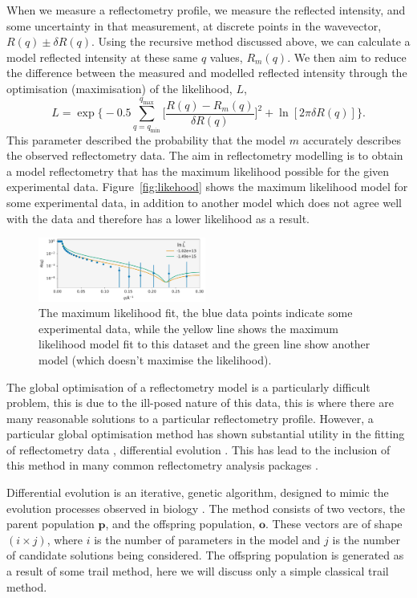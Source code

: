 \documentclass[
 reprint,
 superscriptaddress,
 amsmath,amssymb,
 aps,
]{revtex4-1}
\begin{document}
When we measure a reflectometry profile, we measure the reflected intensity, and some uncertainty in that measurement, at discrete points in the wavevector, $R(q) \pm \delta R(q)$. 
Using the recursive method discussed above, we can calculate a model reflected intensity at these same $q$ values, $R_m(q)$. 
We then aim to reduce the difference between the measured and modelled reflected intensity through the optimisation (maximisation) of the likelihood, $L$, 
%
\begin{equation}
    L = \exp{\bigg\{-0.5 \sum_{q=q_{\text{min}}}^{q_{\text{max}}} \bigg[\frac{R(q) - R_m(q)}{\delta R(q)}\bigg]^2 + \ln[2\pi \delta R(q)]\bigg\}}.
\end{equation}
%
This parameter described the probability that the model $m$ accurately describes the observed reflectometry data. 
The aim in reflectometry modelling is to obtain a model reflectometry that has the maximum likelihood possible for the given experimental data. 
Figure~\ref{fig:likehood} shows the maximum likelihood model for some experimental data, in addition to another model which does not agree well with the data and therefore has a lower likelihood as a result. 
%
\begin{figure}[t]
    \includegraphics[width=0.49\textwidth]{likelihood}
    \caption{The maximum likelihood fit, the blue data points indicate some experimental data, while the yellow line shows the maximum likelihood model fit to this dataset and the green line show another model (which doesn't maximise the likelihood).}
    \label{fig:likelihood}
\end{figure}
%

The global optimisation of a reflectometry model is a particularly difficult problem, this is due to the ill-posed nature of this data, this is where there are many reasonable solutions to a particular reflectometry profile.
However, a particular global optimisation method has shown substantial utility in the fitting of reflectometry data \cite{varderlee_comparison_2007}, differential evolution \cite{wormington_characterization_1999}.
This has lead to the inclusion of this method in many common reflectometry analysis packages \cite{bjorck_fitting_2011}.

Differential evolution is an iterative, genetic algorithm, designed to mimic the evolution processes observed in biology \cite{holland_adaptation_1992}.
The method consists of two vectors, the parent population $\mathbf{p}$, and the offspring population, $\mathbf{o}$. 
These vectors are of shape $(i \times j)$, where $i$ is the number of parameters in the model and $j$ is the number of candidate solutions being considered. 
The offspring population is generated as a result of some trail method, here we will discuss only a simple classical trail method.
\end{document}
